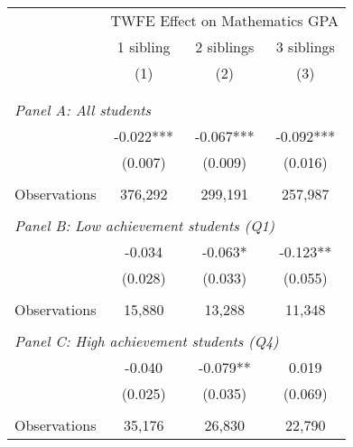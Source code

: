 \makeatletter
{}
{
\makeatother
\begin{tabular}{lccc}
\toprule
\cmidrule(lr){2-4}
& \multicolumn{3}{c}{TWFE Effect on Mathematics GPA} \\
\cmidrule(lr){2-4}
& 1 sibling & 2 siblings & 3 siblings  \\
\cmidrule(lr){2-2} \cmidrule(lr){3-3} \cmidrule(lr){4-4}
& (1) & (2) & (3)\\
\bottomrule
&  &  &  \\
&  &  &   \\
\multicolumn{4}{l}{\textit{Panel A: All students}} \\
\hspace{3mm}        &      -0.022***&      -0.067***&      -0.092***\\
                    &     (0.007)   &     (0.009)   &     (0.016)   \\
                    &               &               &               \\
\hspace{3mm}Observations&     376,292   &     299,191   &     257,987   \\
 
&  &  &   \\
\multicolumn{4}{l}{\textit{Panel B: Low achievement students (Q1)}} \\
\hspace{3mm}        &      -0.034   &      -0.063*  &      -0.123** \\
                    &     (0.028)   &     (0.033)   &     (0.055)   \\
                    &               &               &               \\
\hspace{3mm}Observations&      15,880   &      13,288   &      11,348   \\
 
&  &  &   \\
\multicolumn{4}{l}{\textit{Panel C: High achievement students (Q4)}} \\
\hspace{3mm}        &      -0.040   &      -0.079** &       0.019   \\
                    &     (0.025)   &     (0.035)   &     (0.069)   \\
                    &               &               &               \\
\hspace{3mm}Observations&      35,176   &      26,830   &      22,790   \\
 

\end{tabular}}
